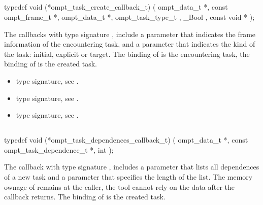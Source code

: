 \subsection{}
\label{subsec:ompt_task_create_callback_t}
\format
\begin{boxedcode}
typedef void (*ompt\_task\_create\_callback\_t) (
  ompt\_data\_t *,
  const ompt\_frame\_t *,
  ompt\_data\_t *,
  ompt\_task\_type\_t ,
  \_Bool ,
  const void *
);
\end{boxedcode}
\descr
The callbacks with type signature ,
include a parameter 
that indicates the frame information of the encountering task, and a parameter
 that indicates the kind of the task: initial, explicit or target.
The binding of  is the encountering task,
the binding of  is the created task.

\crossreferences
\begin{itemize}
\item {} type signature, see
.
\item {} type signature, see
.
\item {} type signature, see
.
\end{itemize}



\subsection{}
\label{subsec:ompt_task_dependences_callback_t}
\format
\begin{boxedcode}
typedef void (*ompt\_task\_dependences\_callback\_t) (
  ompt\_data\_t *,
  const ompt\_task\_dependence\_t *,
  int 
);
\end{boxedcode}
\descr
The callback with type signature ,
includes a parameter  that lists all dependences of a new task and
a parameter  that specifies the length of the list.
The memory ownage of  remains at the caller, the tool cannot rely on
the data after the callback returns.
The binding of  is the created task.

